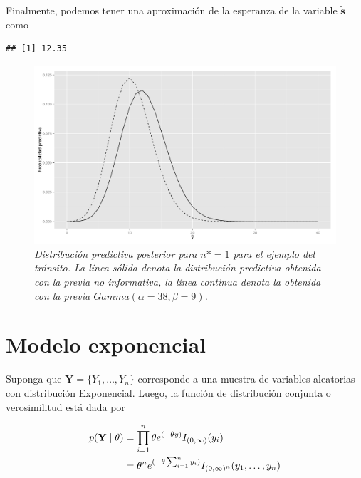 \begin{Eje}
    Finalmente, podemos tener una aproximaci\'on de la esperanza de la variable $\mathbf{\tilde{s}}$ como
\begin{knitrout}
\color{fgcolor}\begin{kframe}
\begin{alltt}
\hlopt{*}
\end{alltt}
\begin{verbatim}
## [1] 12.35
\end{verbatim}
\end{kframe}
\end{knitrout}
    
    \begin{figure}[!h]
    \centering
    \includegraphics[scale=0.4]{predpostpois.pdf}
    \caption{\emph{Distribuci\'on predictiva posterior para $n*=1$ para el ejemplo del tr\'ansito. La l\'inea s\'olida denota la distribuci\'on predictiva obtenida con la previa no informativa, la l\'inea continua denota la obtenida con la previa $Gamma(\alpha=38,\beta=9)$.}}
    \label{pred_post_pois}
    \end{figure}
    
    \end{Eje}
    
    \section{Modelo exponencial}
    
    Suponga que $\mathbf{Y}=\{Y_1,\ldots,Y_n\}$ corresponde a una muestra de variables aleatorias con distribuci\'on Exponencial. Luego, la funci\'on de distribuci\'on conjunta o verosimilitud est\'a dada por
    
    \begin{align}
    p(\mathbf{Y} \mid \theta)&=\prod_{i=1}^n\theta e^{(-\theta y)}I_{(0,\infty)}(y_i) \notag \\
    &=\theta^n e^{(-\theta \sum_{i=1}^ny_i)}I_{(0,\infty)^n}(y_1,\ldots,y_n)
    \end{align}
    
